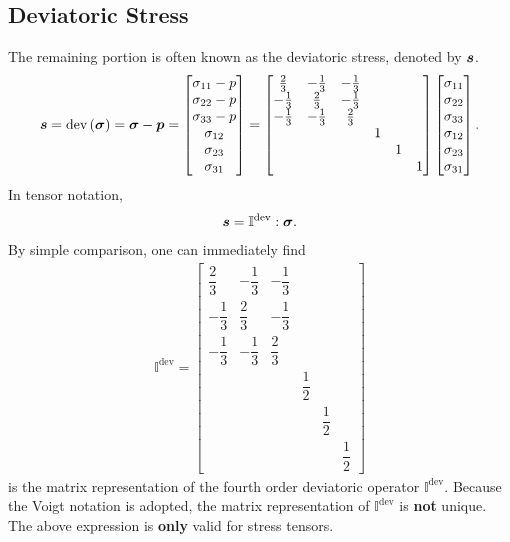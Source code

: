 \subsection{Deviatoric Stress}
The remaining portion is often known as the deviatoric stress, denoted by $\bm{s}$.
\begin{gather}
\bm{s}=\text{dev}\left(\bm{\sigma}\right)=\bm{\sigma}-\bm{p}=\begin{bmatrix}
\sigma_{11}-p\\\sigma_{22}-p\\\sigma_{33}-p\\\sigma_{12}\\\sigma_{23}\\\sigma_{31}
\end{bmatrix}=\begin{bmatrix}
\frac{2}{3}&-\frac{1}{3}&-\frac{1}{3}&&&\\
-\frac{1}{3}&\frac{2}{3}&-\frac{1}{3}&&&\\
-\frac{1}{3}&-\frac{1}{3}&\frac{2}{3}&&&\\
&&&1&&\\
&&&&1&\\
&&&&&1
\end{bmatrix}\begin{bmatrix}
\sigma_{11}\\\sigma_{22}\\\sigma_{33}\\\sigma_{12}\\\sigma_{23}\\\sigma_{31}
\end{bmatrix}.
\end{gather}
In tensor notation,
\begin{gather}
\bm{s}=\mathbb{I}^\text{dev}:\bm{\sigma}.
\end{gather}
By simple comparison, one can immediately find
\begin{gather}
\mathbb{I}^\text{dev}=\begin{bmatrix}
\dfrac{2}{3}&-\dfrac{1}{3}&-\dfrac{1}{3}&&&\\[2mm]
-\dfrac{1}{3}&\dfrac{2}{3}&-\dfrac{1}{3}&&&\\[2mm]
-\dfrac{1}{3}&-\dfrac{1}{3}&\dfrac{2}{3}&&&\\[2mm]
&&&\dfrac{1}{2}&&\\[2mm]
&&&&\dfrac{1}{2}&\\[2mm]
&&&&&\dfrac{1}{2}
\end{bmatrix}
\end{gather}
is the matrix representation of the fourth order deviatoric operator $\mathbb{I}^\text{dev}$.
Because the Voigt notation is adopted, the matrix representation of $\mathbb{I}^\text{dev}$ is \textbf{not} unique.
The above expression is \textbf{only} valid for stress tensors.

